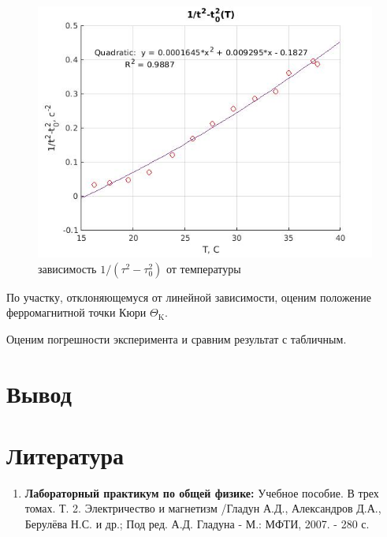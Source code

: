 \documentclass[a4paper, 12pt]{article}%
\begin{document}
\begin{figure}[h!]
    \centering
	\includegraphics[width = \textwidth]{g1.jpg}
    \caption{зависимость $1 /\left(\tau^{2}-\tau_{0}^{2}\right)$ от температуры }
    \label{scheme}
\end{figure}


По участку, отклоняющемуся от линейной зависимости, оценим положение ферромагнитной точки Кюри $\Theta_{\mathrm{K}} .$

Оценим погрешности эксперимента и сравним результат с табличным.

\section{Вывод}
 
\section{Литература}

\begin{enumerate}

\item \textbf{Лабораторный практикум по общей физике:} Учебное пособие. В трех томах. Т. 2. Электричество и магнетизм /Гладун А.Д., Александров Д.А., Берулёва Н.С. и др.; Под ред. А.Д. Гладуна - М.: МФТИ, 2007. - 280 с.

\end{enumerate}		
		
\end{document}

